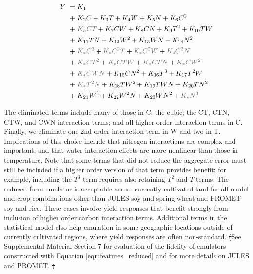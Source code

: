 \documentclass[gmdd]{copernicus} %
\providecommand{\DIFadd}[1]{{\protect\color{blue}\uwave{#1}}} %
\providecommand{\DIFdel}[1]{{\protect\color{red}\sout{#1}}}                      %
\providecommand{\DIFaddbegin}{} %
\providecommand{\DIFaddend}{} %
\providecommand{\DIFdelbegin}{} %
\providecommand{\DIFdelend}{} %
\begin{document}
\vspace{-0.3in}
\begin{align}
    \hspace{10mm}  \label{eqn:features_reduced}
        Y\ = \ & K_{1} \\
        + \ & K_{2} C                        + K_{3} T                        + K_{4} W                        + K_{5} N       + K_{6} C^2      \nonumber \\
        + \ & {\color{dark-gray}K_{a} C T}   + K_{7} C W                      + K_{8} C N                      + K_{9} T^2     + K_{10} T W     \nonumber \\
        + \ & K_{11} T N                     + K_{12} W^2                     + K_{13} W N                     + K_{14} N^2                     \nonumber \\
        + \ & {\color{dark-gray}K_{*} C^3}   + {\color{dark-gray}K_{*} C^2 T} + {\color{dark-gray}K_{*} C^2 W} + {\color{dark-gray}K_{*} C^2 N} \nonumber \\
        + \ & {\color{dark-gray}K_{*} C T^2} + {\color{dark-gray}K_{*} C T W} + {\color{dark-gray}K_{*} C T N} + {\color{dark-gray}K_{*} C W^2} \nonumber \\
        + \ & {\color{dark-gray}K_{*} C W N} + K_{15} C N^2                   + K_{16} T^3                     + K_{17} T^2 W                   \nonumber \\
        + \ & {\color{dark-gray}K_{*} T^2 N} + K_{18} T W^2                   + K_{19} T W N                   + K_{20} T N^2                   \nonumber \\
        + \ & K_{21} W^3                     + K_{22} W^2 N                   + K_{23} W N^2                   + {\color{dark-gray}K_{*} N^3}   \nonumber
\end{align}

\noindent The eliminated terms include many of those in C: the cubic; the CT, CTN, CTW, and CWN interaction terms; and all higher order interaction terms in C. 
Finally, we eliminate one 2nd-order interaction term in W and two in T. 
Implications of this choice include that nitrogen interactions are complex and important, and that water interaction effects are more nonlinear than those in temperature.  
Note that some terms that did not reduce the aggregate error must still be included if a higher order version of that term provides benefit: for example, including the $T^3$ term requires also retaining $T^2$ and $T$ terms. 
The reduced-form emulator is acceptable across currently cultivated land for all model and crop combinations other than JULES soy and spring wheat and PROMET soy and rice.
These cases involve yield responses that benefit strongly from inclusion of higher order carbon \DIFaddbegin \DIFadd{dioxide }\DIFaddend interaction terms. 
Additional terms in the statistical model also help emulation in some geographic locations outside of currently cultivated regions, where yield responses are often non-standard. 
\DIFdelbegin \DIFdel{(}\DIFdelend See Supplemental Material Section 7 for evaluation of the fidelity of emulators constructed with Equation \ref{eqn:features_reduced} and for more details on JULES and PROMET.
\DIFdelbegin \DIFdel{)
}\DIFdelend 
\end{document}
